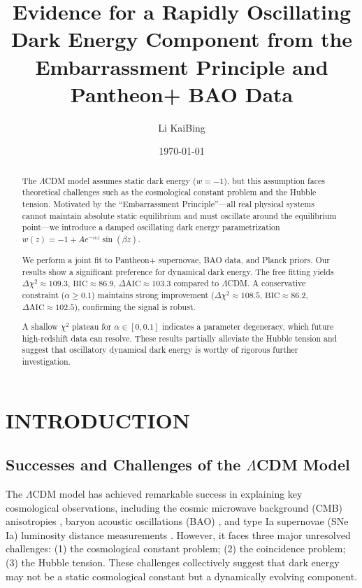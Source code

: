 \documentclass[10pt,twocolumn]{article}
\title{Evidence for a Rapidly Oscillating Dark Energy Component from the Embarrassment Principle and Pantheon+ BAO Data}
\author{Li KaiBing }
\date{\today}
\def\BIC{\text{BIC}}
\def\AIC{\text{AIC}}
\begin{document}
\maketitle

\begin{abstract}
The $\Lambda$CDM model assumes static dark energy ($w=-1$), but this assumption faces theoretical challenges such as the cosmological constant problem and the Hubble tension. Motivated by the ``Embarrassment Principle''—all real physical systems cannot maintain absolute static equilibrium and must oscillate around the equilibrium point—we introduce a damped oscillating dark energy parametrization $w(z) = -1 + A e^{-\alpha z}\sin(\beta z)$.

We perform a joint fit to Pantheon+ supernovae, BAO data, and Planck priors. Our results show a significant preference for dynamical dark energy. The free fitting yields $\Delta\chi^2 \approx 109.3$, $\BIC \approx 86.9$, $\Delta\AIC \approx 103.3$ compared to $\Lambda$CDM. A conservative constraint ($\alpha\geq 0.1$) maintains strong improvement ($\Delta\chi^2 \approx 108.5$, $\BIC \approx 86.2$, $\Delta\AIC \approx 102.5$), confirming the signal is robust.

A shallow $\chi^2$ plateau for $\alpha \in [0, 0.1]$ indicates a parameter degeneracy, which future high-redshift data can resolve. These results partially alleviate the Hubble tension and suggest that oscillatory dynamical dark energy is worthy of rigorous further investigation.
\end{abstract}

\section{INTRODUCTION}
\subsection{Successes and Challenges of the $\Lambda$CDM Model}
The $\Lambda$CDM model has achieved remarkable success in explaining key cosmological observations, including the cosmic microwave background (CMB) anisotropies \cite{planck2020}, baryon acoustic oscillations (BAO) \cite{alam2017}, and type Ia supernovae (SNe Ia) luminosity distance measurements \cite{scolnic2022}. However, it faces three major unresolved challenges: (1) the cosmological constant problem; (2) the coincidence problem; (3) the Hubble tension. These challenges collectively suggest that dark energy may not be a static cosmological constant but a dynamically evolving component.
\end{document}
